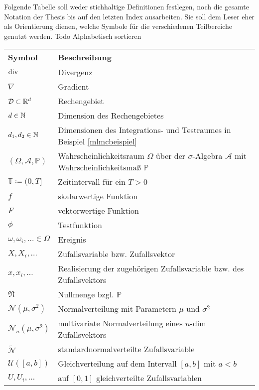 Folgende Tabelle soll weder stichhaltige Definitionen festlegen, noch die gesamte Notation der Thesis bis auf den letzten Index ausarbeiten. Sie soll dem Leser eher als Orientierung dienen, welche Symbole für die verschiedenen Teilbereiche genutzt werden.
Todo Alphabetisch sortieren

\begin{longtable}[c]{ p{} p{}}
	\hline
	Symbol    & Beschreibung   \\
	\hline
	$ \operatorname{div} $ & Divergenz \\
	$ \nabla $ & Gradient \\
	$ \mathcal{D} \subset \mathbb{R}^d$      & Rechengebiet       \\
	$ d \in \mathbb{N} $      & Dimension des Rechengebietes        \\
	$ d_1, d_2 \in \mathbb{N} $ & Dimensionen des Integrations- und Testraumes in Beispiel \ref{mlmcbeispiel}  \\
	$ (\Omega,\mathcal{A},\mathbb{P}) $       & Wahrscheinlichkeitsraum $ \Omega $ über der $ \sigma $-Algebra $ \mathcal{A} $ mit Wahrscheinlichkeitsmaß $ \mathbb{P} $       \\
	$ \mathbb{T} \coloneqq  (0,T]  $  &  Zeitintervall für ein $ T>0 $       \\
	$ f $ & skalarwertige Funktion \\
	$ F $ & vektorwertige Funktion \\
	$ \phi $ & Testfunktion \\
	$ \omega ,\omega_i , \dots \in \Omega $ & Ereignis \\
	$ X , X_i , \dots $ & Zufallsvariable bzw. Zufallsvektor \\
	$ x , x_i , \dots $ & Realisierung der zugehörigen Zufallsvariable bzw. des Zufallsvektors \\
	$ \mathfrak{N} $ & Nullmenge bzgl. $ \mathbb{P} $ \\
	$ \mathcal{N}(\mu,\sigma^2) $ & Normalverteilung mit Parametern $ \mu $ und $ \sigma^2 $ \\
	$ \mathcal{N}_n(\mu,\sigma^2) $ & multivariate Normalverteilung eines $ n $-dim Zufallsvektors\\
	$\widetilde{\mathcal{N}}$ & standardnormalverteilte Zufallsvariable \\
	$ \mathcal{U}([a,b]) $ & Gleichverteilung auf dem Intervall $ [a,b] $ mit $ a<b $ \\
	$ U,U_i,\dots $ &  auf $ [0,1] $  gleichverteilte Zufallsvariablen \\

\end{longtable}
